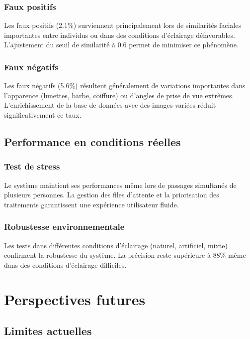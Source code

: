 \documentclass[12pt,a4paper]{article}
\begin{document}
\subsubsection{Faux positifs}
Les faux positifs (2.1\%) surviennent principalement lors de similarités faciales importantes entre individus ou dans des conditions d'éclairage défavorables. L'ajustement du seuil de similarité à 0.6 permet de minimiser ce phénomène.

\subsubsection{Faux négatifs}
Les faux négatifs (5.6\%) résultent généralement de variations importantes dans l'apparence (lunettes, barbe, coiffure) ou d'angles de prise de vue extrêmes. L'enrichissement de la base de données avec des images variées réduit significativement ce taux.

\subsection{Performance en conditions réelles}
\label{sec:real-world}

\subsubsection{Test de stress}
Le système maintient ses performances même lors de passages simultanés de plusieurs personnes. La gestion des files d'attente et la priorisation des traitements garantissent une expérience utilisateur fluide.

\subsubsection{Robustesse environnementale}
Les tests dans différentes conditions d'éclairage (naturel, artificiel, mixte) confirment la robustesse du système. La précision reste supérieure à 88\% même dans des conditions d'éclairage difficiles.


\newpage

\section{Perspectives futures}

\subsection{Limites actuelles}
\end{document}
